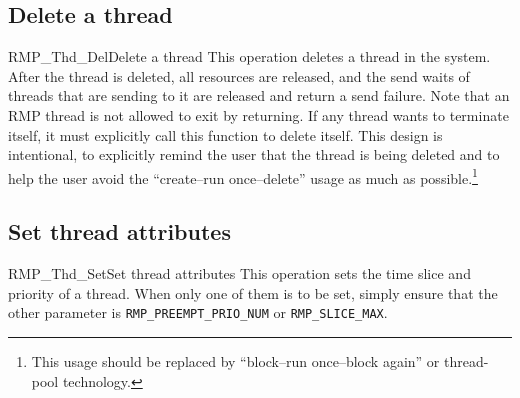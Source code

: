 \subsection{Delete a thread}
\begin{apidesc}{RMP\_Thd\_Del}{Delete a thread}\label{api:RMP_Thd_Del}
    This operation deletes a thread in the system.
    After the thread is deleted, all resources are released, and the send waits of threads that are sending to it are released and return a send failure.
    Note that an RMP thread is not allowed to exit by returning.
    If any thread wants to terminate itself, it must explicitly call this function to delete itself.
    This design is intentional, to explicitly remind the user that the thread is being deleted and to help the user avoid the ``create--run once--delete'' usage as much as possible.\footnote{This usage should be replaced by ``block--run once--block again'' or thread-pool technology.}
    \begin{apiparams}
    \end{apiparams}
    \begin{apiret}
    \end{apiret}
\end{apidesc}

\subsection{Set thread attributes}
\begin{apidesc}{RMP\_Thd\_Set}{Set thread attributes}\label{api:RMP_Thd_Set}
    This operation sets the time slice and priority of a thread.
    When only one of them is to be set, simply ensure that the other parameter is \texttt{RMP\_PREEMPT\_PRIO\_NUM} or \texttt{RMP\_SLICE\_MAX}.
    \begin{apiparams}
    \end{apiparams}
    \begin{apiret}
    \end{apiret}
\end{apidesc}

